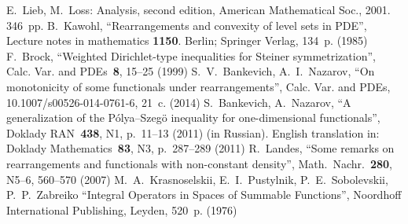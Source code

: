 \begin{thebibliography}{99}
 E.~Lieb, M.~Loss: Analysis, second edition, American Mathematical Soc., 2001. 346~pp.
 B.~Kawohl, ``Rearrangements and convexity of level sets in PDE'',
Lecture notes in mathematics {\bf1150}. Berlin; Springer Verlag, 134~p. (1985)
 F.~Brock, ``Weighted Dirichlet-type inequalities for Steiner symmetrization'',
Calc. Var. and PDEs~{\bf8}, 15--25 (1999)
 S.~V.~Bankevich, A.~I.~Nazarov, ``On monotonicity of some functionals under rearrangements'', Calc. Var. and PDEs, 10.1007/s00526-014-0761-6, 21~c. (2014)
 S.~Bankevich, A.~Nazarov, ``A generalization of the P\'olya--Szeg\"o inequality for one-dimensional functionals'',
Doklady RAN~{\bf438}, N1, p.~11--13 (2011) (in Russian).
English translation in:
Doklady Mathematics~{\bf83}, N3, p.~287--289 (2011)
 R.~Landes, ``Some remarks on rearrangements and functionals with non-constant density'',
Math.~Nachr.~{\bf280}, N5--6, 560--570 (2007)
 M.~A.~Krasnoselskii, E.~I.~Pustylnik, P.~E.~Sobolevskii, P.~P.~Zabreiko ``Integral Operators in Spaces of Summable Functions'',
Noordhoff International Publishing, Leyden, 520~p. (1976)
\end{thebibliography}
